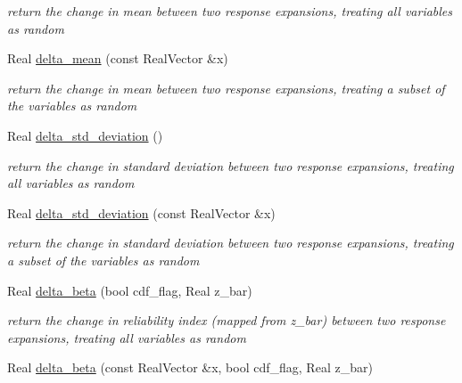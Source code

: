 \begin{DoxyCompactItemize}
\begin{DoxyCompactList}\small\item\em return the change in mean between two response expansions, treating all variables as random \end{DoxyCompactList}\item 
Real \hyperlink{classPecos_1_1HierarchInterpPolyApproximation_a47a27e963aa71bb3dfc2aa623f7f3e92}{delta\+\_\+mean} (const Real\+Vector \&x)\label{classPecos_1_1HierarchInterpPolyApproximation_a47a27e963aa71bb3dfc2aa623f7f3e92}

\begin{DoxyCompactList}\small\item\em return the change in mean between two response expansions, treating a subset of the variables as random \end{DoxyCompactList}\item 
Real \hyperlink{classPecos_1_1HierarchInterpPolyApproximation_a91067291a8c8ca1f582e24706aac5ea7}{delta\+\_\+std\+\_\+deviation} ()\label{classPecos_1_1HierarchInterpPolyApproximation_a91067291a8c8ca1f582e24706aac5ea7}

\begin{DoxyCompactList}\small\item\em return the change in standard deviation between two response expansions, treating all variables as random \end{DoxyCompactList}\item 
Real \hyperlink{classPecos_1_1HierarchInterpPolyApproximation_a4755135ffbf0475a447f71d7b782afa8}{delta\+\_\+std\+\_\+deviation} (const Real\+Vector \&x)\label{classPecos_1_1HierarchInterpPolyApproximation_a4755135ffbf0475a447f71d7b782afa8}

\begin{DoxyCompactList}\small\item\em return the change in standard deviation between two response expansions, treating a subset of the variables as random \end{DoxyCompactList}\item 
Real \hyperlink{classPecos_1_1HierarchInterpPolyApproximation_af4a1a73ea647b8989096db81a7e36278}{delta\+\_\+beta} (bool cdf\+\_\+flag, Real z\+\_\+bar)\label{classPecos_1_1HierarchInterpPolyApproximation_af4a1a73ea647b8989096db81a7e36278}

\begin{DoxyCompactList}\small\item\em return the change in reliability index (mapped from z\+\_\+bar) between two response expansions, treating all variables as random \end{DoxyCompactList}\item 
Real \hyperlink{classPecos_1_1HierarchInterpPolyApproximation_ad878382953dfa3146f4862f6195ea351}{delta\+\_\+beta} (const Real\+Vector \&x, bool cdf\+\_\+flag, Real z\+\_\+bar)\label{classPecos_1_1HierarchInterpPolyApproximation_ad878382953dfa3146f4862f6195ea351}


\end{DoxyCompactItemize}
